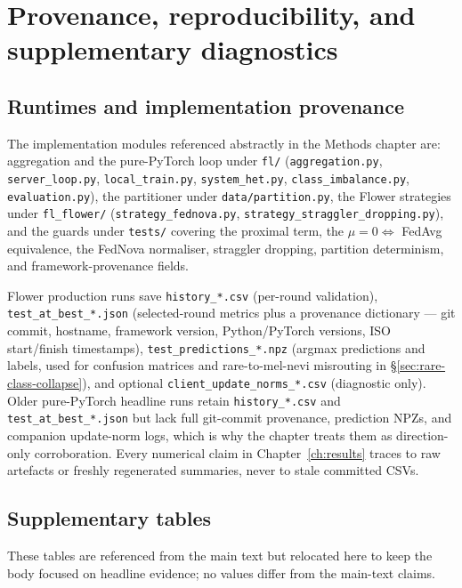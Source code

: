 \documentclass[11pt,a4paper]{report}
\begin{document}
\chapter{Provenance, reproducibility, and supplementary diagnostics}
\label{app:repro}

\section{Runtimes and implementation provenance}
\label{app:provenance}

The implementation modules referenced abstractly in the Methods chapter are:
aggregation and the pure-PyTorch loop under \texttt{fl/} (\texttt{aggregation.py},
\texttt{server\_loop.py}, \texttt{local\_train.py}, \texttt{system\_het.py},
\texttt{class\_imbalance.py}, \texttt{evaluation.py}), the partitioner under
\texttt{data/partition.py}, the Flower strategies under \texttt{fl\_flower/}
(\texttt{strategy\_fednova.py}, \texttt{strategy\_straggler\_dropping.py}), and the
guards under \texttt{tests/} covering the proximal term, the
$\mu = 0 \Leftrightarrow$ FedAvg equivalence, the FedNova normaliser, straggler
dropping, partition determinism, and framework-provenance fields.

Flower production runs save \texttt{history\_*.csv} (per-round validation),
\texttt{test\_at\_best\_*.json} (selected-round metrics plus a provenance
dictionary --- git commit, hostname, framework version, Python/PyTorch versions,
ISO start/finish timestamps), \texttt{test\_predictions\_*.npz} (argmax
predictions and labels, used for confusion matrices and rare-to-mel-nevi
misrouting in §\ref{sec:rare-class-collapse}), and optional
\texttt{client\_update\_norms\_*.csv} (diagnostic only). Older pure-PyTorch
headline runs retain \texttt{history\_*.csv} and \texttt{test\_at\_best\_*.json}
but lack full git-commit provenance, prediction NPZs, and companion update-norm
logs, which is why the chapter treats them as direction-only corroboration. Every
numerical claim in Chapter~\ref{ch:results} traces to raw artefacts or freshly
regenerated summaries, never to stale committed CSVs.

\section{Supplementary tables}
\label{app:supp-tables}

These tables are referenced from the main text but relocated here to keep the
body focused on headline evidence; no values differ from the main-text claims.
\end{document}
